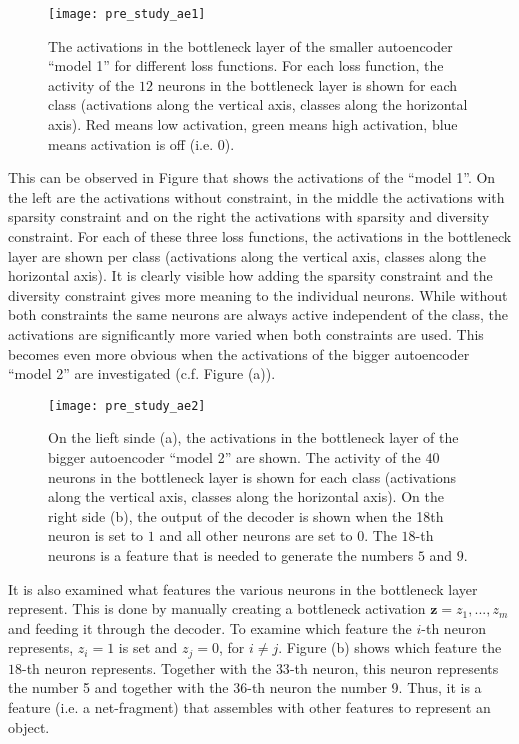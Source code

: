 \begin{figure}[h]
    \centering
    \texttt{[image: pre\_study\_ae1]}
    \caption[Network activations of the smaller autoencoder network on the straight line dataset]{The activations in the bottleneck layer of the smaller autoencoder ``model 1'' for different loss functions. For each loss function, the activity of the $12$ neurons in the bottleneck layer is shown for each class (activations along the vertical axis, classes along the horizontal axis). Red means low activation, green means high activation, blue means activation is off (i.e. $0$).}
\end{figure}


This can be observed in Figure  that shows the activations of the ``model 1''.
On the left are the activations without constraint, in the middle the activations with sparsity constraint and on the right the activations with sparsity and diversity constraint.
For each of these three loss functions, the activations in the bottleneck layer are shown per class (activations along the vertical axis, classes along the horizontal axis).
It is clearly visible how adding the sparsity constraint and the diversity constraint gives more meaning to the individual neurons. While without both constraints the same neurons are always active independent of the class, the activations are significantly more varied when both constraints are used.
This becomes even more obvious when the activations of the bigger autoencoder ``model 2'' are investigated (c.f. Figure  (a)).

\begin{figure}[h]
    \centering
    \texttt{[image: pre\_study\_ae2]}
    \caption[Network activations of the bigger autoencoder network on the straight line dataset]{On the lieft sinde (a), the activations in the bottleneck layer of the bigger autoencoder ``model 2'' are shown. The activity of the $40$ neurons in the bottleneck layer is shown for each class (activations along the vertical axis, classes along the horizontal axis). On the right side (b), the output of the decoder is shown when the 18th neuron is set to $1$ and all other neurons are set to $0$. The $18$-th neurons is a feature that is needed to generate the numbers $5$ and $9$.}
\end{figure}

It is also examined what features the various neurons in the bottleneck layer represent.
This is done by manually creating a bottleneck activation $\boldsymbol{z} = z_1, ..., z_m$ and feeding it through the decoder.
To examine which feature the $i$-th neuron represents, $z_i=1$ is set and $z_{j}=0$, for $i \neq j$.
Figure  (b) shows which feature the $18$-th neuron represents. Together with the $33$-th neuron, this neuron represents the number 5 and together with the $36$-th neuron the number 9.
Thus, it is a feature (i.e. a net-fragment) that assembles with other features to represent an object.


